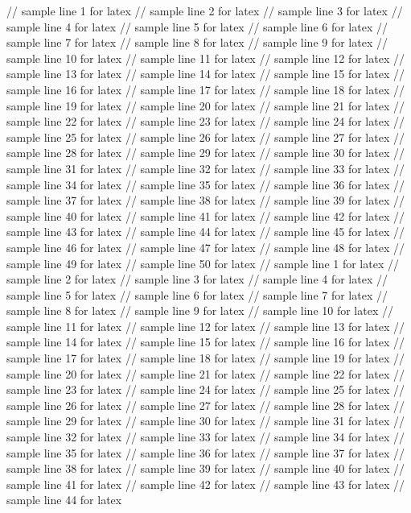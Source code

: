 // sample line 1 for latex
// sample line 2 for latex
// sample line 3 for latex
// sample line 4 for latex
// sample line 5 for latex
// sample line 6 for latex
// sample line 7 for latex
// sample line 8 for latex
// sample line 9 for latex
// sample line 10 for latex
// sample line 11 for latex
// sample line 12 for latex
// sample line 13 for latex
// sample line 14 for latex
// sample line 15 for latex
// sample line 16 for latex
// sample line 17 for latex
// sample line 18 for latex
// sample line 19 for latex
// sample line 20 for latex
// sample line 21 for latex
// sample line 22 for latex
// sample line 23 for latex
// sample line 24 for latex
// sample line 25 for latex
// sample line 26 for latex
// sample line 27 for latex
// sample line 28 for latex
// sample line 29 for latex
// sample line 30 for latex
// sample line 31 for latex
// sample line 32 for latex
// sample line 33 for latex
// sample line 34 for latex
// sample line 35 for latex
// sample line 36 for latex
// sample line 37 for latex
// sample line 38 for latex
// sample line 39 for latex
// sample line 40 for latex
// sample line 41 for latex
// sample line 42 for latex
// sample line 43 for latex
// sample line 44 for latex
// sample line 45 for latex
// sample line 46 for latex
// sample line 47 for latex
// sample line 48 for latex
// sample line 49 for latex
// sample line 50 for latex
// sample line 1 for latex
// sample line 2 for latex
// sample line 3 for latex
// sample line 4 for latex
// sample line 5 for latex
// sample line 6 for latex
// sample line 7 for latex
// sample line 8 for latex
// sample line 9 for latex
// sample line 10 for latex
// sample line 11 for latex
// sample line 12 for latex
// sample line 13 for latex
// sample line 14 for latex
// sample line 15 for latex
// sample line 16 for latex
// sample line 17 for latex
// sample line 18 for latex
// sample line 19 for latex
// sample line 20 for latex
// sample line 21 for latex
// sample line 22 for latex
// sample line 23 for latex
// sample line 24 for latex
// sample line 25 for latex
// sample line 26 for latex
// sample line 27 for latex
// sample line 28 for latex
// sample line 29 for latex
// sample line 30 for latex
// sample line 31 for latex
// sample line 32 for latex
// sample line 33 for latex
// sample line 34 for latex
// sample line 35 for latex
// sample line 36 for latex
// sample line 37 for latex
// sample line 38 for latex
// sample line 39 for latex
// sample line 40 for latex
// sample line 41 for latex
// sample line 42 for latex
// sample line 43 for latex
// sample line 44 for latex
